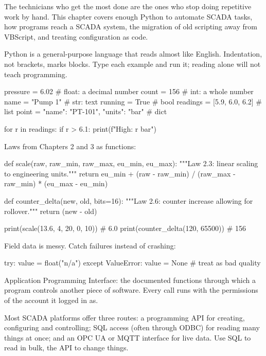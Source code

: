The technicians who get the most done are the ones who stop doing repetitive work by hand. This chapter covers enough Python to automate SCADA tasks, how programs reach a SCADA system, the migration of old scripting away from VBScript, and treating configuration as code.

Python is a general-purpose language that reads almost like English. Indentation, not brackets, marks blocks. Type each example and run it; reading alone will not teach programming.
\begin{code}
pressure = 6.02                      # float: a decimal number
count = 156                          # int: a whole number
name = "Pump 1"                      # str: text
running = True                       # bool
readings = [5.9, 6.0, 6.2]           # list
point = {"name": "PT-101", "units": "bar"}   # dict

for r in readings:
    if r > 6.1:
        print(f"High: {r} bar")
\end{code}
Laws from Chapters 2 and 3 as functions:
\begin{code}
def scale(raw, raw_min, raw_max, eu_min, eu_max):
    """Law 2.3: linear scaling to engineering units."""
    return eu_min + (raw - raw_min) / (raw_max - raw_min) * (eu_max - eu_min)

def counter_delta(new, old, bits=16):
    """Law 2.6: counter increase allowing for rollover."""
    return (new - old) %

print(scale(13.6, 4, 20, 0, 10))     # 6.0
print(counter_delta(120, 65500))     # 156
\end{code}
Field data is messy. Catch failures instead of crashing:
\begin{code}
try:
    value = float("n/a")
except ValueError:
    value = None                     # treat as bad quality
\end{code}

 Application Programming Interface: the documented functions through which a program controls another piece of software. Every call runs with the permissions of the account it logged in as.

Most SCADA platforms offer three routes: a programming API for creating, configuring and controlling; SQL access (often through ODBC) for reading many things at once; and an OPC UA or MQTT interface for live data. Use SQL to read in bulk, the API to change things.

